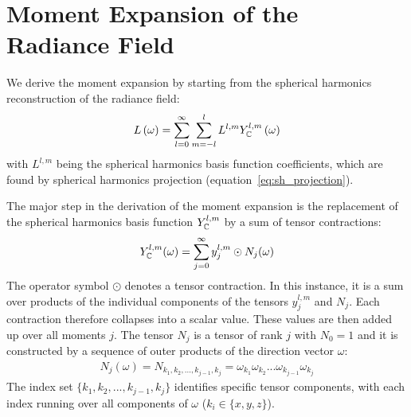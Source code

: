 \section{Moment Expansion of the Radiance Field}
\label{sec:da_moment_expansion_L}


We derive the moment expansion by starting from the spherical harmonics reconstruction of the radiance field:
\begin{align}
\label{eq:fld_moment_expansion_sh_expansion}
L\left(\omega\right) =
\sum_{l=0}^{\infty}\sum_{m=-l}^{l}L^{l,m}Y_{\mathbb{C}}^{l,m}
\left(\omega\right)
\end{align}
with $L^{l,m}$ being the spherical harmonics basis function coefficients, which are found by spherical harmonics projection (equation~\ref{eq:sh_projection}).

The major step in the derivation of the moment expansion is the replacement of the spherical harmonics basis function $Y_{\mathbb{C}}^{l,m}$ by a sum of tensor contractions:
\begin{align}
\label{eq:fld_moment_expansion_sum}
Y_{\mathbb{C}}^{l,m}(\omega) =
\sum_{j=0}^\infty{y^{l,m}_j\odot N_j(\omega)}
\end{align}
The operator symbol $\odot$ denotes a tensor contraction. In this instance, it is a sum over products of the individual components of the tensors $y^{l,m}_j$ and $N_j$. Each contraction therefore collapses into a scalar value. These values are then added up over all moments $j$. The tensor $N_j$ is a tensor of rank $j$ with $N_0=1$ and it is constructed by a sequence of outer products of the direction vector $\omega$:
\begin{align}
N_j\left(\omega\right)
=N_{k_1, k_2, ..., k_{j-1}, k_j} 
=\omega_{k_1}\omega_{k_2}...\omega_{k_{j-1}}\omega_{k_j} 
\end{align}
The index set $\{k_1, k_2, ..., k_{j-1}, k_j\}$ identifies specific tensor components, with each index running over all components of $\omega$ ($k_i \in \{x, y, z\}$).

